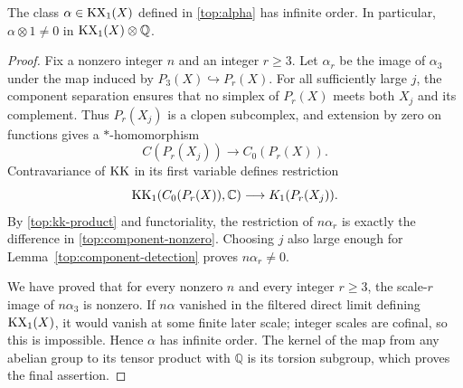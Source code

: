 \begin{proposition}
\label{top:infinite-order}
The class $\alpha\in\operatorname{KX}_1(X)$ defined in \eqref{top:alpha} has infinite
order. In particular, $\alpha\otimes1\neq0$ in
$\operatorname{KX}_1(X)\otimes\mathbb Q$.
\end{proposition}

\begin{proof}
Fix a nonzero integer $n$ and an integer $r\geq3$. Let $\alpha_r$ be
the image of $\alpha_3$ under the map induced by
$P_3(X)\hookrightarrow P_r(X)$. For all sufficiently large $j$, the
component separation ensures that no simplex of $P_r(X)$ meets both
$X_j$ and its complement. Thus $P_r(X_j)$ is a clopen subcomplex, and
extension by zero on functions gives a $*$-homomorphism
\[
 C(P_r(X_j))\longrightarrow C_0(P_r(X)).
\]
Contravariance of $\operatorname{KK}$ in its first variable defines restriction
\[
 \operatorname{KK}_1(C_0(P_r(X)),\mathbb C)\longrightarrow K_1(P_r(X_j)).
\]
By \eqref{top:kk-product} and functoriality, the restriction of
$n\alpha_r$ is exactly the difference in
\eqref{top:component-nonzero}. Choosing $j$ also large enough for
Lemma~\ref{top:component-detection} proves $n\alpha_r\neq0$.

We have proved that for every nonzero $n$ and every integer $r\geq3$,
the scale-$r$ image of $n\alpha_3$ is nonzero. If $n\alpha$ vanished
in the filtered direct limit defining $\operatorname{KX}_1(X)$, it would vanish at
some finite later scale; integer scales are cofinal, so this is
impossible. Hence $\alpha$ has infinite order. The kernel of the map
from any abelian group to its tensor product with $\mathbb Q$ is its
torsion subgroup, which proves the final assertion.
\end{proof}
